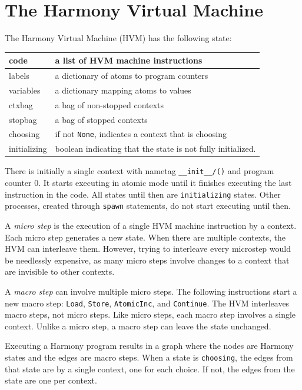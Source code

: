 \documentclass{report}
\begin{document}
\chapter{The Harmony Virtual Machine}

The Harmony Virtual Machine (HVM) has the following state:

\vspace{1em}
\begin{tabular}{|l|l|}
\hline
code & a list of HVM machine instructions \\
\hline
labels & a dictionary of atoms to program counters \\
\hline
variables & a dictionary mapping atoms to values \\
\hline
ctxbag & a bag of non-stopped contexts \\
\hline
stopbag & a bag of stopped contexts \\
\hline
choosing & if not \texttt{None}, indicates a context that is choosing \\
\hline
initializing & boolean indicating that the state is not fully initialized. \\
\hline
\end{tabular}
\vspace{1em}

There is initially a single context with nametag
\texttt{\_\_init\_\_/()} and program counter 0.  It starts executing
in atomic mode until it finishes executing the last instruction in
the code.  All states until then are \texttt{initializing} states.
Other processes, created through \texttt{spawn} statements, do not
start executing until then.

A \emph{micro step}
is the execution of a single HVM machine instruction
by a context.
Each micro step generates a new state.
When there are multiple contexts, the HVM can interleave them.
However, trying to interleave every microstep would be needlessly expensive,
as many micro steps involve changes to a context that are invisible to
other contexts.

A \emph{macro step}
%
can involve multiple micro steps.  The following
instructions start a new macro step: \texttt{Load}, \texttt{Store},
\texttt{AtomicInc}, and \texttt{Continue}.  The HVM
interleaves macro steps, not micro steps.  Like micro steps, each
macro step involves a single context.  Unlike a micro step, a macro
step can leave the state unchanged.

Executing a Harmony program results in a graph where the nodes are Harmony
states and the edges are macro steps.
When a state is \texttt{choosing}, the edges from that state are
by a single context, one for each choice.  If not, the edges from
the state are one per context.
\end{document}
